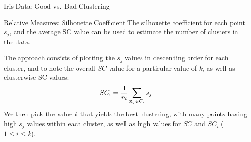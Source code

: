 \begin{frame}[fragile]{Iris Data: Good vs.\ Bad Clustering}
\setcounter{subfigure}{0}
\begin{figure}
    \centering
    \captionsetup[subfloat]{captionskip=20pt}
    \def\pshlabel#1{ {\footnotesize $#1$}}
    \def\psvlabel#1{ {\footnotesize $#1$}}
    \centerline{
	\hspace{0.4in}
	}
\end{figure}
  \begin{center}
\end{center}
\end{frame}




\begin{frame}{Relative Measures: Silhouette Coeff\/{i}cient}
The silhouette coeff\/{i}cient for each
point $s_{j}$, and the average SC value
can be used to estimate the number of clusters
in the data. 

\medskip
The approach consists of plotting the $s_{j}$ values in
descending order for each cluster, and to note the overall $SC$ value
for a particular value of $k$, as well as clusterwise SC values:
\begin{align*}
  SC_i = \frac{1}{n_i}\sum_{\mathbf{x}_{j} \in C_i} s_{j}
\end{align*}
We then pick the value $k$ that yields the best clustering, with
many points having high $s_{j}$ values within each cluster, as well as
high values for $SC$ and $SC_i$ ($1 \le i \le k$).
\end{frame}




